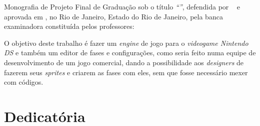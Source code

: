 \documentclass[brazil]{abnt}
\begin{document}

\capa
\folhaderosto

\begin{folhadeaprovacao}
Monografia de Projeto Final de Graduação sob o título \textit{``\ABNTtitulodata''},
defendida por \ABNTautordata~ e aprovada em \ABNTdatadata, no Rio de Janeiro,
Estado do Rio de Janeiro, pela banca examinadora constituída pelos
professores: \setlength{\ABNTsignthickness}{0.4pt}

  
\end{folhadeaprovacao}

\begin{resumo}
O objetivo deste trabalho é fazer um \textit{engine} de jogo para o \textit{videogame Nintendo DS\texttrademark} e também um editor de fases 
e configurações, como seria feito numa equipe de desenvolvimento de um jogo comercial, dando a possibilidade aos \textit{designers} 
de fazerem seus \textit{sprites} e criarem as fases com eles, sem que fosse necessário mexer com códigos.
\end{resumo}

\begin{abstract}
The objective of this paper is to make a game engine to the Nintendo DS\texttrademark system and a level and configurations editor, as it
would be done in a development team in a comercial game, giving designers the possibility to make their sprites and create their levels 
without touching actual source code.
\end{abstract}

\chapter*{Dedicatória}
\end{document}
